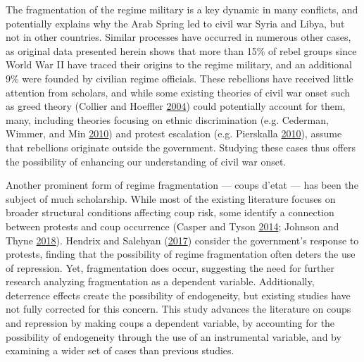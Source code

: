 \documentclass[12pt,]{article}
\theoremstyle{definition}
\theoremstyle{definition}
\theoremstyle{definition}
\theoremstyle{remark}
\begin{document}
The fragmentation of the regime military is a key dynamic in many
conflicts, and potentially explains why the Arab Spring led to civil war
Syria and Libya, but not in other countries. Similar processes have
occurred in numerous other cases, as original data presented herein
shows that more than 15\% of rebel groups since World War II have traced
their origins to the regime military, and an additional 9\% were founded
by civilian regime officials. These rebellions have received little
attention from scholars, and while some existing theories of civil war
onset such as greed theory (Collier and Hoeffler
\protect\hyperlink{ref-Collier2004}{2004}) could potentially account for
them, many, including theories focusing on ethnic discrimination (e.g.
Cederman, Wimmer, and Min \protect\hyperlink{ref-Cederman2010}{2010})
and protest escalation (e.g. Pierskalla
\protect\hyperlink{ref-Pierskalla2010}{2010}), assume that rebellions
originate outside the government. Studying these cases thus offers the
possibility of enhancing our understanding of civil war onset.

Another prominent form of regime fragmentation --- coups d'etat --- has
been the subject of much scholarship. While most of the existing
literature focuses on broader structural conditions affecting coup risk,
some identify a connection between protests and coup occurrence (Casper
and Tyson \protect\hyperlink{ref-Casper2014}{2014}; Johnson and Thyne
\protect\hyperlink{ref-Johnson2018}{2018}). Hendrix and Salehyan
(\protect\hyperlink{ref-Hendrix2017}{2017}) consider the government's
response to protests, finding that the possibility of regime
fragmentation often deters the use of repression. Yet, fragmentation
does occur, suggesting the need for further research analyzing
fragmentation as a dependent variable. Additionally, deterrence effects
create the possibility of endogeneity, but existing studies have not
fully corrected for this concern. This study advances the literature on
coups and repression by making coups a dependent variable, by accounting
for the possibility of endogeneity through the use of an instrumental
variable, and by examining a wider set of cases than previous studies.
\end{document}
